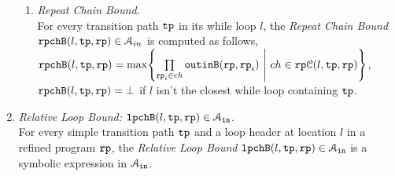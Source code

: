 \begin{enumerate}
\begin{enumerate}
\item  \emph{Repeat Chain Bound}.
\\
For every transition path $\mathtt{tp}$
in its  while loop $l$,
the \emph{Repeat Chain Bound} $\mathtt{rpchB}(l, \mathtt{tp}, \mathtt{rp}) \in \mathcal{A}_{in}$ is computed as follows,
  \\
  $\rpchB(l, \tpath, \rprog) = \max \left\{ \prod\limits_{\rprog_i \in ch}  \outinB(\rprog, \rprog_i) 
  ~\middle\vert~ ch \in \rpchset(l, \tpath, \rprog) \right\}
  $,
  \\
  $\mathtt{rpchB}(l, \mathtt{tp}, \mathtt{rp}) = \bot$ if $l$ isn't the closest while loop containing $\mathtt{tp}$.
  \end{enumerate}
%
\item \emph{Relative Loop Bound:} $\mathtt{lpchB}(l, \mathtt{tp}, \mathtt{rp}) \in \mathcal{A}_{\mathtt{in}}$.
\\
For every simple transition path $\mathtt{tp}$
and a loop header at location $l$ in a refined program $\mathtt{rp}$,
the \emph{Relative Loop Bound} $\mathtt{lpchB}(l, \mathtt{tp}, \mathtt{rp}) \in \mathcal{A}_{\mathtt{in}}$ is a symbolic expression in $\mathcal{A}_{\mathtt{in}}$.

\end{enumerate}
